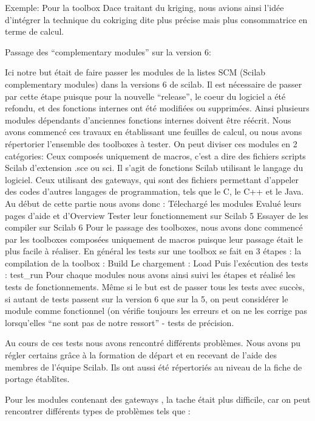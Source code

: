 Exemple:
Pour la toolbox Dace traitant du kriging, nous avions ainsi l’idée d'intégrer la technique du cokriging dite plus précise mais plus consommatrice en terme de calcul.

Passage des “complementary modules” sur la version 6:

Ici notre but était de faire passer les modules de la listes SCM (Scilab complementary modules) dans la versions 6 de scilab. Il est nécessaire de passer par cette étape puisque pour la nouvelle “release”, le coeur du logiciel a été refondu, et des fonctions internes ont été modifiées ou supprimées. Ainsi plusieurs modules dépendants d’anciennes fonctions internes doivent être réécrit.
Nous avons commencé ces travaux en établissant une feuilles de calcul, ou nous avons répertorier l’ensemble des toolboxes à tester.
On peut diviser ces modules en 2 catégories:
Ceux composés uniquement de macros, c’est a dire des fichiers scripts Scilab d’extension .sce ou sci. Il s’agit de fonctions Scilab utilisant le langage du logiciel.
Ceux utilisant des gateways, qui sont des fichiers permettant d’appeler des codes d’autres langages de programmation, tels que le C, le C++ et le Java.
Au début de cette partie nous avons donc :
Télechargé les modules
Evalué leurs pages d’aide et d’Overview
Tester leur fonctionnement sur Scilab 5
Essayer de les compiler sur Scilab 6
Pour le passage des toolboxes, nous avons donc commencé par les toolboxes composées uniquement de macros puisque leur passage était le plus facile à réaliser.
En général les tests sur une toolbox se fait en 3 étapes :
la compilation de la toolbox : Build
Le chargement : Load
Puis l'exécution des tests : test_run
Pour chaque modules nous avons ainsi suivi les étapes et réalisé les tests de fonctionnements. Même si le but est de passer tous les tests avec succès, si autant de tests passent sur la version 6 que sur la 5, on peut considérer le module comme fonctionnel (on vérifie toujours les erreurs et on ne les corrige pas lorsqu’elles “ne sont pas de notre ressort” - tests de précision.

Au cours de ces tests nous avons rencontré différents problèmes. Nous avons pu régler certains grâce  à la  formation de départ et en recevant de l’aide des membres de l'équipe Scilab. Ils ont aussi été répertoriés au niveau de la fiche de portage établîtes.

Pour les modules contenant des gateways , la tache était plus difficile, car on peut rencontrer différents types de problèmes tels que :

